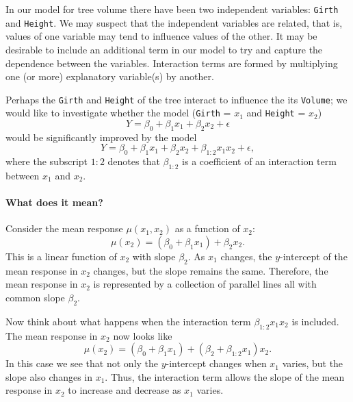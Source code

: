 \documentclass[captions=tableheading]{scrbook}
\begin{document}
\label{sec:Interaction}

In our model for tree volume there have been two independent variables: \texttt{Girth} and \texttt{Height}. We may suspect that the independent variables are related, that is, values of one variable may tend to influence values of the other. It may be desirable to include an additional term in our model to try and capture the dependence between the variables. Interaction terms are formed by multiplying one (or more) explanatory variable(s) by another. 


\begin{example}
Perhaps the \texttt{Girth} and \texttt{Height} of the tree interact to influence the its \texttt{Volume}; we would like to investigate whether the model (\texttt{Girth} = \(x_{1}\) and \texttt{Height} = \(x_{2}\)) 
\begin{equation}
Y=\beta_{0}+\beta_{1}x_{1}+\beta_{2}x_{2}+\epsilon
\end{equation}
would be significantly improved by the model
\begin{equation}
Y=\beta_{0}+\beta_{1}x_{1}+\beta_{2}x_{2}+\beta_{1:2}x_{1}x_{2}+\epsilon,
\end{equation}
where the subscript \(1:2\) denotes that \(\beta_{1:2}\) is a coefficient
of an interaction term between \(x{}_{1}\) and \(x_{2}\). 

\end{example}

\paragraph*{What does it mean?}

Consider the mean response \(\mu(x_{1},x_{2})\) as a function of \(x_{2}\):
\begin{equation}
\mu(x_{2})=(\beta_{0}+\beta_{1}x_{1})+\beta_{2}x_{2}.
\end{equation}
This is a linear function of \(x_{2}\) with slope \(\beta_{2}\). As \(x_{1}\) changes, the \(y\)-intercept of the mean response in \(x_{2}\) changes, but the slope remains the same. Therefore, the mean response in \(x_{2}\) is represented by a collection of parallel lines all with common slope \(\beta_{2}\).

Now think about what happens when the interaction term \(\beta_{1:2}x_{1}x_{2}\) is included. The mean response in \(x_{2}\) now looks like
\begin{equation}
\mu(x_{2})=(\beta_{0}+\beta_{1}x_{1})+(\beta_{2}+\beta_{1:2}x_{1})x_{2}.
\end{equation}
In this case we see that not only the \(y\)-intercept changes when \(x_{1}\) varies, but the slope also changes in \(x_{1}\). Thus, the interaction term allows the slope of the mean response in \(x_{2}\) to increase and decrease as \(x_{1}\) varies. 
\end{document}
